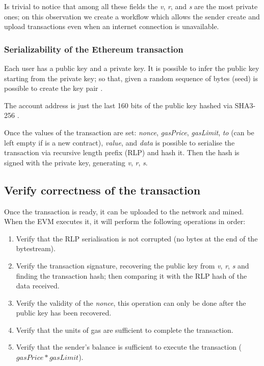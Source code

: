 Is trivial to notice that among all these fields the \textit{v}, \textit{r}, and \textit{s} are the most private ones; on this observation we create a workflow which allows the sender create and upload transactions even when an internet connection is unavailable. 

\subsubsection{Serializability of the Ethereum transaction}
Each user has a public key and a private key. It is possible to infer the public key starting from the private key; so that, given a random sequence of bytes (seed) is possible to create the key pair \cite{ethereum_yellowpaper}.

The account address is just the last 160 bits of the public key hashed via SHA3-256 \cite{sha3_256_keccak}.

Once the values of the transaction are set: \textit{nonce}, \textit{gasPrice}, \textit{gasLimit}, \textit{to} (can be left empty if is a new contract), \textit{value}, and \textit{data} is possible to serialise the transaction via recursive length prefix (RLP) \cite{wood_ethereum_2014} and hash it. Then the hash is signed with the private key, generating \textit{v}, \textit{r}, \textit{s}.

\subsection{Verify correctness of the transaction}
Once the transaction is ready, it can be uploaded to the network and mined. When the EVM executes it, it will perform the following operations in order:
\begin{enumerate}
  \item Verify that the RLP serialisation is not corrupted (no bytes at the end of the bytestream).
  \item Verify the transaction signature, recovering the public key from \textit{v}, \textit{r}, \textit{s} and finding the transaction hash; then comparing it with the RLP hash of the data received.
  \item Verify the validity of the \textit{nonce}, this operation can only be done after the public key has been recovered.
  \item Verify that the units of gas are sufficient to complete the transaction.
  \item Verify that the sender's balance is sufficient to execute the transaction ($gasPrice * gasLimit$).
\end{enumerate}

